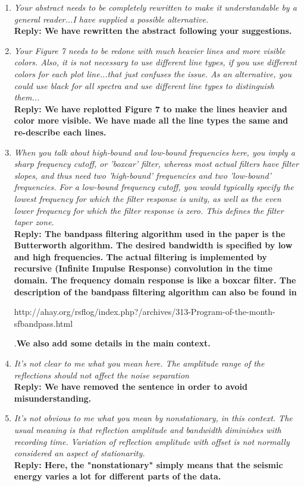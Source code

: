 \begin{enumerate}
\item\emph{Your abstract needs to be completely rewritten to make it understandable by a general reader...I have supplied a possible alternative.}\\
\textbf{Reply:  We have rewritten the abstract following your suggestions.}

\item\emph{Your Figure 7 needs to be redone with much heavier lines and more visible colors. Also, it is not necessary to use different line types, if you use different colors for each plot line...that just confuses the issue. As an alternative, you could use black for all spectra and use different line types to distinguish them...}\\
\textbf{Reply: We have replotted Figure 7 to make the lines heavier and color more visible. We have made all the line types the same and re-describe each lines. }

\item\emph{When you talk about high-bound and low-bound frequencies here, you imply a sharp frequency cutoff, or 'boxcar' filter, whereas most actual filters have filter slopes, and thus need two 'high-bound' frequencies and two 'low-bound' frequencies. For a low-bound frequency cutoff, you would typically specify the lowest frequency for which the filter response is unity, as well as the even lower frequency for which the filter response is zero. This defines the filter taper zone.}\\
\textbf{Reply: The bandpass filtering algorithm used in the paper is the Butterworth algorithm. The desired bandwidth is specified by low and high frequencies. The actual filtering is implemented by recursive  (Infinite Impulse Response) convolution in the time domain. The frequency domain response is like a boxcar filter. The description of the bandpass filtering algorithm can also be found in}\\
\begin{url}
http://ahay.org/rsflog/index.php?/archives/313-Program-of-the-month-sfbandpass.html
\end{url}.\textbf{We also add some details in the main context.}


\item\emph{It's not clear to me what you mean here. The amplitude range of the reflections should not affect the noise separation}\\
\textbf{Reply: We have removed the sentence in order to avoid misunderstanding.}

\item\emph{It's not obvious to me what you mean by nonstationary, in this context. The usual meaning is that reflection amplitude and bandwidth diminishes with recording time. Variation of reflection amplitude with offset is not normally considered an aspect of stationarity.}\\
\textbf{Reply: Here, the "nonstationary" simply means that the seismic energy varies a lot for different parts of the data.}


\end{enumerate}


%
%

